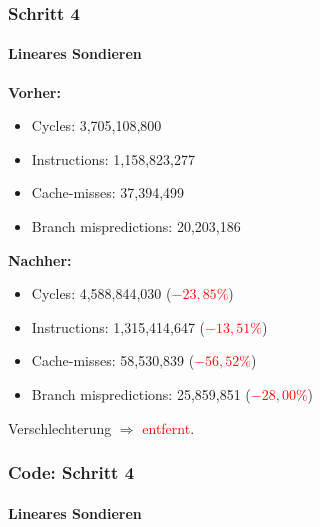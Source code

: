 \documentclass{beamer}
\newcommand{\fail}[1]{\textcolor{red}{#1}}
\begin{document}
  \begin{frame}
  	\frametitle{Schritt 4}
  	\framesubtitle{Lineares Sondieren}
  	\textbf{Vorher:}
  	\begin{itemize}
			\item Cycles: 3,705,108,800 \\
			\item Instructions: 1,158,823,277\\
			\item Cache-misses: 37,394,499\\
			\item Branch mispredictions: 20,203,186\\
		\end{itemize}

		\textbf{Nachher:}
		\begin{itemize}
			\item Cycles: 4,588,844,030 (\fail{$- 23,85 \%$})\\
			\item Instructions: 1,315,414,647 (\fail{$- 13,51 \%$})\\
			\item Cache-misses: 58,530,839 (\fail{$- 56,52 \%$})\\
			\item Branch mispredictions: 25,859,851 (\fail{$- 28,00 \%$})\\
		\end{itemize}
		Verschlechterung $\Rightarrow$ \fail{entfernt}.
  \end{frame}

  \begin{frame}
  	\frametitle{Code: Schritt 4}
  	\framesubtitle{Lineares Sondieren}
		\sLinear
  \end{frame}
\end{document}
